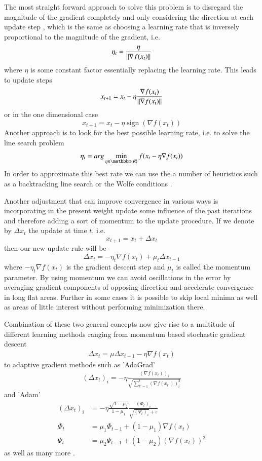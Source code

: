 \documentclass[preprint,12pt,3p]{elsarticle}
\DeclareMathOperator{\sign}{sign}
\begin{document}
The most straight forward approach to solve this problem is to disregard the magnitude of the gradient completely and only considering the direction at each update step \cite{riedmiller1993direct}, which is the same as choosing a learning rate that is inversely proportional to the magnitude of the gradient, i.e.
$$\eta_t=\frac{\eta}{\Arrowvert\nabla f(x_t)\Arrowvert}$$
where $\eta$ is some constant factor essentially replacing the learning rate. This leads to update steps
$$x_{t+1}=x_t-\eta\frac{\nabla f(x_t)}{\Arrowvert\nabla f(x_t)\Arrowvert}$$
or in the one dimensional case
$$x_{t+1}=x_t-\eta \sign(\nabla f(x_t))$$
Another approach is to look for the best possible learning rate, i.e. to solve the line search problem
$$\eta_t=arg\min_{\eta\in\mathbbm{R}}f(x_t-\eta\nabla f(x_t))$$
In order to approximate this best rate we can use the a number of heuristics such as a backtracking line search or the Wolfe conditions \cite{wolfe1969convergence}. 

Another adjustment that can improve convergence in various ways is incorporating in the present weight update some influence of the past iterations and therefore adding a sort of momentum to the update procedure. If we denote by $\Delta x_t$ the update at time $t$, i.e.
$$x_{t+1}=x_t+\Delta x_t$$
then our new update rule will be
$$\Delta x_t=-\eta_t\nabla f(x_t)+\mu_t\Delta x_{t-1}$$
where $-\eta_t\nabla f(x_t)$ is the gradient descent step and $\mu_t$ is called the momentum parameter. By using momentum we can avoid oscillations in the error by averaging gradient components of opposing direction and accelerate convergence in long flat areas. Further in some cases it is possible to skip local minima as well as areas of little interest without performing minimization there.

Combination of these two general concepts now give rise to a multitude of different learning methods ranging from momentum based stochastic gradient descent \cite{bottou2012stochastic}
\begin{align*}
    \Delta x_t=\mu\Delta x_{t-1}-\eta\nabla f(x_t)
\end{align*}
to adaptive gradient methods such as 'AdaGrad' \cite{duchi2011adaptive} 
\begin{align*}
    (\Delta x_t)_i=-\eta\frac{(\nabla f(x_t))_i}{\sqrt{\sum_{t'=1}^t(\nabla f(x_{t'}))_i^2}}
\end{align*}
and 'Adam' \cite{kingma2014adam}
\begin{align*}
     (\Delta x_t)_i&=-\eta\frac{\sqrt{1-\mu_2}}{1-\mu_1}\frac{(\Phi_t)_i}{\sqrt{(\Psi_t)_i}+\varepsilon}\\
     \Phi_t&=\mu_1\Phi_{t-1}+(1-\mu_1)\nabla f(x_t)\\
     \Psi_t&=\mu_2\Psi_{t-1}+(1-\mu_2)(\nabla f(x_t))^2
\end{align*}
as well as many more \cite{tieleman2012lecture,zeiler2012adadelta,sutskever2013importance}.
\end{document}
